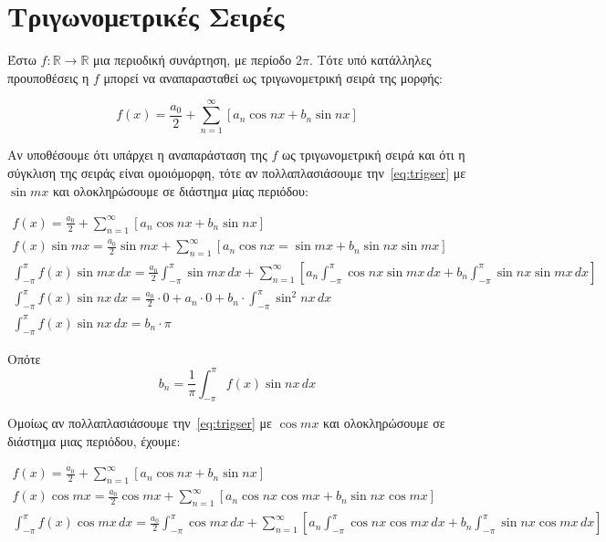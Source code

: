 \section{Τριγωνομετρικές Σειρές}

Έστω $ f \colon \mathbb{R} \to \mathbb{R} $ μια περιοδική συνάρτηση, με περίοδο 
$ 2 \pi $. Τότε υπό κατάλληλες προυποθέσεις η $f$ μπορεί να αναπαρασταθεί ως 
\textcolor{Col1}{τριγωνομετρική} σειρά της μορφής:

\begin{equation}\label{eq:trigser}
    f(x) = \frac{a_{0}}{2} + \sum_{n=1}^{\infty} [a_{n} \cos{nx}  + b_{n} \sin{nx}]
\end{equation} 

Αν υποθέσουμε ότι υπάρχει η αναπαράσταση της $f$ ως τριγωνομετρική σειρά και ότι 
η σύγκλιση της σειράς είναι ομοιόμορφη, τότε αν πολλαπλασιάσουμε την~\eqref{eq:trigser}
με $ \sin{mx} $ και ολοκληρώσουμε σε διάστημα μίας περιόδου: 

\begin{gather*}
    f(x) = \frac{a_{0}}{2} + \sum_{n=1}^{\infty} [a_{n} \cos{nx} + b_{n} \sin{nx}]  \\
    f(x) \sin{mx} = \frac{a_{0}}{2} \sin{mx} + \sum_{n=1}^{\infty} 
    [a_{n} \cos{nx} = \sin{mx} + b_{n} \sin{nx} \sin{mx}]   \\
    \int _{- \pi} ^{\pi} f(x) \sin{mx} \,{dx} = \frac{a_{0}}{2} \int _{- \pi}^{\pi} 
    \sin{mx} \,{dx} + \sum_{n=1}^{\infty} \left[a_{n} \int _{- \pi}^{\pi} 
        \cos{nx} \sin{mx}  \,{dx} + b_{n} \int _{- \pi }^{\pi} \sin{nx} \sin{mx} 
    \,{dx}\right] \\
    \int _{- \pi }^{\pi} f(x) \sin{nx} \,{dx} = \frac{a_{0}}{2} \cdot 0 + 
    a_{n}\cdot 0 + b_{n} \cdot \int _{- \pi}^{\pi } \sin^{2}{nx} \,{dx} \\
    \int _{- \pi }^{\pi} f(x) \sin{nx} \,{dx} =  b_{n} \cdot \pi 
\end{gather*}   

Οπότε 
\[
    \boxed{b_{n} = \frac{1}{\pi} \int _{- \pi }^{\pi} f(x) \sin{nx} \,{dx}}
\] 

Ομοίως αν πολλαπλασιάσουμε την~\eqref{eq:trigser} με $ \cos{mx} $ και ολοκληρώσουμε 
σε διάστημα μιας περιόδου, έχουμε:

\begin{gather*}
    f(x) = \frac{a_{0}}{2} + \sum_{n=1}^{\infty} [a_{n} \cos{nx} + b_{n} \sin{nx}]  \\
    f(x) \cos{mx} = \frac{a_{0}}{2} \cos{mx} + \sum_{n=1}^{\infty} 
    [a_{n} \cos{nx} \cos{mx} + b_{n} \sin{nx} \cos{mx}]   \\
    \int _{- \pi} ^{\pi} f(x) \cos{mx} \,{dx} = \frac{a_{0}}{2} \int _{- \pi}^{\pi} 
    \cos{mx} \,{dx} + \sum_{n=1}^{\infty} \left[a_{n} \int _{- \pi}^{\pi}
        \cos{nx} \cos{mx}  \,{dx} + b_{n} \int _{- \pi }^{\pi} \sin{nx} \cos{mx} 
    \,{dx}\right] \\
\end{gather*}

